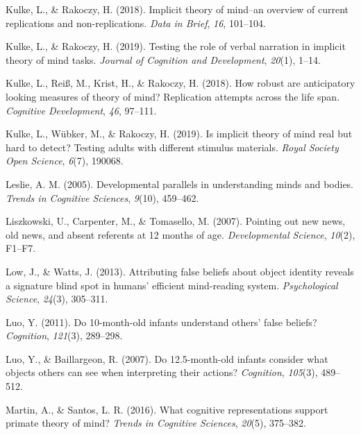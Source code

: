 \documentclass[
  man,floatsintext]{apa6}
\newlength{\cslhangindent}
\newenvironment{CSLReferences}[2] %
 {\begin{list}{}{%
  \setlength{\itemindent}{0pt}
  \setlength{\leftmargin}{0pt}
  \setlength{\parsep}{0pt}
  \ifodd #1
   \setlength{\leftmargin}{\cslhangindent}
   \setlength{\itemindent}{-1\cslhangindent}
  \fi
  \setlength{\itemsep}{#2\baselineskip}}}
 {\end{list}}
\begin{document}
\begin{CSLReferences}{1}{0}
Kulke, L., \& Rakoczy, H. (2018). Implicit theory of mind--an overview of current replications and non-replications. \emph{Data in Brief}, \emph{16}, 101--104.

Kulke, L., \& Rakoczy, H. (2019). Testing the role of verbal narration in implicit theory of mind tasks. \emph{Journal of Cognition and Development}, \emph{20}(1), 1--14.

Kulke, L., Reiß, M., Krist, H., \& Rakoczy, H. (2018). How robust are anticipatory looking measures of theory of mind? Replication attempts across the life span. \emph{Cognitive Development}, \emph{46}, 97--111.

Kulke, L., Wübker, M., \& Rakoczy, H. (2019). Is implicit theory of mind real but hard to detect? Testing adults with different stimulus materials. \emph{Royal Society Open Science}, \emph{6}(7), 190068.

Leslie, A. M. (2005). Developmental parallels in understanding minds and bodies. \emph{Trends in Cognitive Sciences}, \emph{9}(10), 459--462.

Liszkowski, U., Carpenter, M., \& Tomasello, M. (2007). Pointing out new news, old news, and absent referents at 12 months of age. \emph{Developmental Science}, \emph{10}(2), F1--F7.

Low, J., \& Watts, J. (2013). Attributing false beliefs about object identity reveals a signature blind spot in humans' efficient mind-reading system. \emph{Psychological Science}, \emph{24}(3), 305--311.

Luo, Y. (2011). Do 10-month-old infants understand others' false beliefs? \emph{Cognition}, \emph{121}(3), 289--298.

Luo, Y., \& Baillargeon, R. (2007). Do 12.5-month-old infants consider what objects others can see when interpreting their actions? \emph{Cognition}, \emph{105}(3), 489--512.

Martin, A., \& Santos, L. R. (2016). What cognitive representations support primate theory of mind? \emph{Trends in Cognitive Sciences}, \emph{20}(5), 375--382.


\end{CSLReferences}
\end{document}
